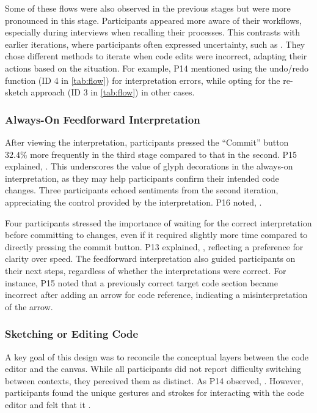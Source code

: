 Some of these flows were also observed in the previous stages but were more pronounced in this stage. Participants appeared more aware of their workflows, especially during interviews when recalling their processes. This contrasts with earlier iterations, where participants often expressed uncertainty, such as . They chose different methods to iterate when code edits were incorrect, adapting their actions based on the situation. For example, P14 mentioned using the undo/redo function (ID 4 in \autoref{tab:flow}) for interpretation errors, while opting for the re-sketch approach (ID 3 in \autoref{tab:flow}) in other cases.

\subsubsection{Always-On Feedforward Interpretation}
After viewing the interpretation, participants pressed the ``Commit'' button $32.4\%$ more frequently in the third stage compared to that in the second. P15 explained, . This underscores the value of glyph decorations in the always-on interpretation, as they may help participants confirm their intended code changes. Three participants echoed sentiments from the second iteration, appreciating the control provided by the interpretation. P16 noted, . 

Four participants stressed the importance of waiting for the correct interpretation before committing to changes, even if it required slightly more time compared to directly pressing the commit button. P13 explained, , reflecting a preference for clarity over speed. 
The feedforward interpretation also guided participants on their next steps, regardless of whether the interpretations were correct. For instance, P15 noted that a previously correct target code section became incorrect after adding an arrow for code reference, indicating a misinterpretation of the arrow.

\subsubsection{Sketching or Editing Code}
A key goal of this design was to reconcile the conceptual layers between the code editor and the canvas.
While all participants did not report difficulty switching between contexts, they perceived them as distinct. As P14 observed, . However, participants found the unique gestures and strokes for interacting with the code editor  and felt that it .

